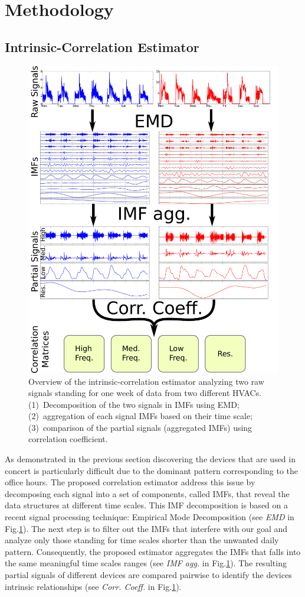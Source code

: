 
\section{Methodology}

\subsection{Intrinsic-Correlation Estimator} \label{methodo:est}

\begin{figure}[t!]
 \includegraphics[width=.5\textwidth]{img/estimator.pdf}
 \caption{Overview of the intrinsic-correlation estimator analyzing two raw signals standing for one week of data from two different HVACs. (1)~Decomposition of the two signals in IMFs using EMD; (2)~aggregation of each signal IMFs based on their time scale; (3)~comparison of the partial signals (aggregated IMFs) using correlation coefficient.}
 \label{fig:diagram1}
\end{figure}

As demonstrated in the previous section discovering the devices that are used in concert is particularly difficult due to the dominant pattern corresponding to the office hours.
The proposed correlation estimator address this issue by decomposing each signal into a set of components, called IMFs, that reveal the data structures at different time scales.
This IMF decomposition is based on a recent signal processing technique: Empirical Mode Decomposition (see \emph{EMD} in Fig.\ref{fig:diagram1}).
The next step is to filter out the IMFs that interfere with our goal and analyze only those standing for time scales shorter than the unwanted daily pattern.
Consequently, the proposed estimator aggregates the IMFs that falls into the same meaningful time scales ranges (see \emph{IMF agg.} in Fig.\ref{fig:diagram1}).
The resulting partial signals of different devices are compared pairwise to identify the devices intrinsic relationships (see \emph{Corr. Coeff.} in Fig.\ref{fig:diagram1}). 

